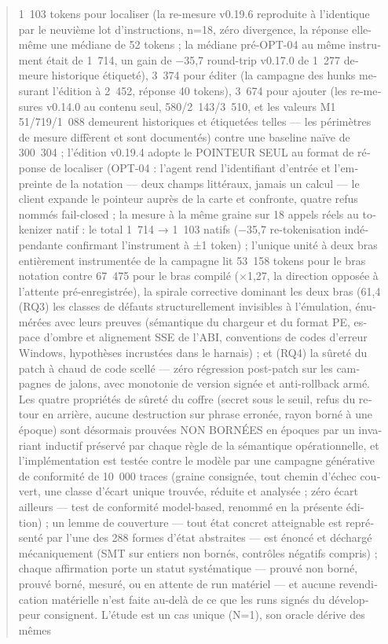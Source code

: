 \documentclass[11pt,a4paper]{article}
\begin{document}
\begin{otherlanguage}{french}
\begin{abstract}
1~103 tokens pour localiser (la re-mesure v0.19.6 reproduite à l'identique par le neuvième lot d'instructions,
n=18, zéro divergence, la réponse elle-même une médiane de 52 tokens ;
la médiane pré-OPT-04 au même instrument était de 1~714, un gain de
−35,7 %
round-trip v0.17.0 de 1~277 demeure historique étiqueté), 3~374 pour
éditer (la campagne des hunks mesurant l'édition à 2~452, réponse 40
tokens), 3~674 pour ajouter (les re-mesures v0.14.0 au contenu seul,
580/2~143/3~510, et les valeurs M1 51/719/1~088 demeurent historiques et
étiquetées telles — les
périmètres de mesure diffèrent et sont documentés) contre une baseline
naïve de 300~304 ; l'édition v0.19.4 adopte le POINTEUR SEUL au
format de réponse de localiser (OPT-04 : l'agent rend l'identifiant
d'entrée et l'empreinte de la notation — deux champs littéraux, jamais un
calcul — le client expande le pointeur auprès de la carte et confronte,
quatre refus nommés fail-closed ; la mesure à la même graine sur 18
appels réels au tokenizer natif : le total 1~714 → 1~103 natifs
(−35,7 %
re-tokenisation indépendante confirmant l'instrument à ±1 token) ;
l'unique unité à deux
bras entièrement instrumentée de la campagne lit 53~158 tokens pour le
bras notation contre 67~475 pour le bras compilé (×1,27, la direction
opposée à l'attente pré-enregistrée), la spirale corrective dominant les
deux bras (61,4 %
(RQ3) les classes de défauts structurellement invisibles à l'émulation,
énumérées avec leurs preuves (sémantique du chargeur et du format PE,
espace d'ombre et alignement SSE de l'ABI, conventions de codes d'erreur
Windows, hypothèses incrustées dans le harnais) ; et (RQ4) la sûreté du
patch à chaud de code scellé — zéro régression post-patch sur les
campagnes de jalons, avec monotonie de version signée et anti-rollback
armé. Les quatre propriétés de sûreté du coffre (secret sous le seuil, refus du retour en arrière, aucune destruction sur phrase erronée, rayon borné à une époque) sont désormais prouvées NON BORNÉES en époques par un invariant inductif préservé par chaque règle de la sémantique opérationnelle, et l'implémentation est testée contre le modèle par une campagne générative de conformité de 10~000 traces (graine consignée, tout chemin d'échec couvert, une classe d'écart unique trouvée, réduite et analysée ; zéro écart ailleurs — test de conformité model-based, renommé en la présente édition) ; un lemme de couverture — tout état concret atteignable est représenté par l'une des 288 formes d'état abstraites — est énoncé et déchargé mécaniquement (SMT sur entiers non bornés, contrôles négatifs compris) ; chaque affirmation porte un statut systématique — prouvé non borné, prouvé borné, mesuré, ou en attente de run matériel — et aucune revendication matérielle n'est faite au-delà de ce que les runs signés du développeur consignent. L'étude est un cas unique (N=1), son oracle dérive des mêmes

\end{abstract}
\end{otherlanguage}
\end{document}
